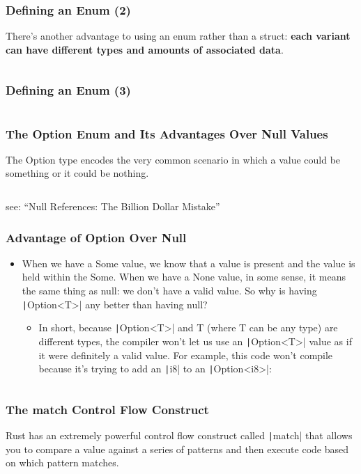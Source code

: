 \documentclass{beamer}
\begin{document}
\begin{frame}[fragile]
	\frametitle{Defining an Enum (2)}
	There’s another advantage to using an enum rather than a struct:\textbf{ each variant can have different types and amounts of associated data}. 
	\inputminted{rust}{./code/enum2.rs}
\end{frame}

\begin{frame}[fragile]
	\frametitle{Defining an Enum (3)}
	
	\inputminted{rust}{./code/enum3.rs}
\end{frame}

\begin{frame}[fragile]
	\frametitle{The Option Enum and Its Advantages Over Null Values}
	The Option type encodes the very common scenario in which a value could be something or it could be nothing.
	\inputminted{rust}{./code/enum4.rs}
	
	see: “Null References: The Billion Dollar Mistake”
\end{frame}

\begin{frame}[fragile]
	\frametitle{Advantage of Option Over Null}
	\begin{itemize}
		\item 	When we have a Some value, we know that a value is present and the value is held within the Some. When we have a None value, in some sense, it means the same thing as null: we don’t have a valid value. So why is having \texttt|Option<T>| any better than having null?
		\begin{itemize}
			\item 	In short, because \texttt|Option<T>| and T (where T can be any type) are different types, the compiler won’t let us use an \texttt|Option<T>| value as if it were definitely a valid value. For example, this code won’t compile because it’s trying to add an \texttt|i8| to an \texttt|Option<i8>|:
		\end{itemize}
	\end{itemize}
	
	\inputminted{rust}{./code/enum5.rs}
\end{frame}

\begin{frame}[fragile]
	\frametitle{The match Control Flow Construct}
	Rust has an extremely powerful control flow construct called \texttt|match| that allows you to compare a value against a series of patterns and then execute code based on which pattern matches.
	\inputminted{rust}{./code/match.rs}
\end{frame}
\end{document}
